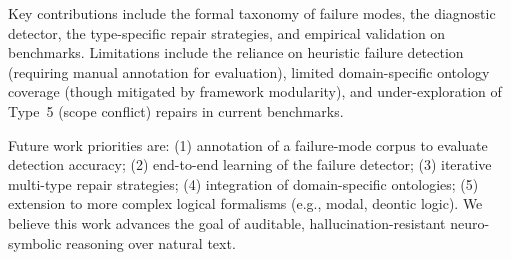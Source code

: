 \documentclass[11pt,letterpaper]{article}
\begin{document}
Key contributions include the formal taxonomy of failure modes, the diagnostic detector, the type-specific repair strategies, and empirical validation on benchmarks. Limitations include the reliance on heuristic failure detection (requiring manual annotation for evaluation), limited domain-specific ontology coverage (though mitigated by framework modularity), and under-exploration of Type~5 (scope conflict) repairs in current benchmarks.

Future work priorities are: (1) annotation of a failure-mode corpus to evaluate detection accuracy; (2) end-to-end learning of the failure detector; (3) iterative multi-type repair strategies; (4) integration of domain-specific ontologies; (5) extension to more complex logical formalisms (e.g., modal, deontic logic). We believe this work advances the goal of auditable, hallucination-resistant neuro-symbolic reasoning over natural text.



\end{document}
